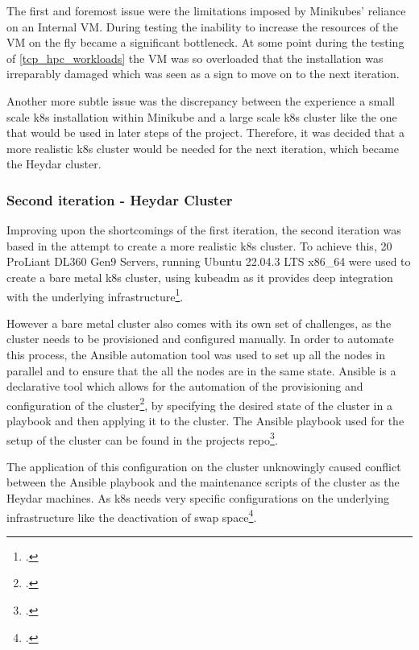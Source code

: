 The first and foremost issue were the limitations imposed by Minikubes' reliance on an Internal \ac{VM}.
During testing the inability to increase the resources of the \ac{VM}  on the fly  became a significant bottleneck.
At some point during the testing of \ref{tcp_hpc_workloads} the \ac{VM} was so overloaded that the installation was irreparably damaged which was seen as a sign to move on to the next iteration.

Another more subtle issue was the discrepancy between the experience a small scale \ac{k8s} installation within Minikube and a large scale \ac{k8s} cluster like the one that would be used in later steps of the project.
Therefore, it was decided that a more realistic \ac{k8s} cluster would be needed for the next iteration, which became the Heydar cluster.

\subsubsection{Second iteration - Heydar Cluster}
\label{heydar_cluster}

Improving upon the shortcomings of the first iteration, the second iteration was based in the attempt to create a more realistic \ac{k8s} cluster.
To achieve this, 20 ProLiant DL360 Gen9 Servers, running Ubuntu 22.04.3 LTS x86\_64 were used to create a bare metal \ac{k8s} cluster,
using kubeadm as it provides deep integration with the underlying infrastructure\footcite{CreatingClusterKubeadm}.

However a bare metal cluster also comes with its own set of challenges, as the cluster needs to be provisioned and configured manually.
In order to automate this process, the Ansible automation tool was used to set up all the nodes in parallel and to ensure that the all the nodes are in the same state.
Ansible is a declarative tool which allows for the automation of the provisioning and configuration of the cluster\footcite{Ansible2023}, by specifying the desired state of the cluster in a playbook and then applying it to the cluster.
The Ansible playbook used for the setup of the cluster can be found in the projects repo\footcite{eckerthProjectRepoAnsible}.

The application of this configuration on the cluster unknowingly caused conflict between the Ansible playbook and the maintenance scripts of the cluster as the Heydar machines.
As \ac{k8s} needs very specific configurations on the underlying infrastructure like the deactivation of swap space\footcite{InstallingKubeadm}.


